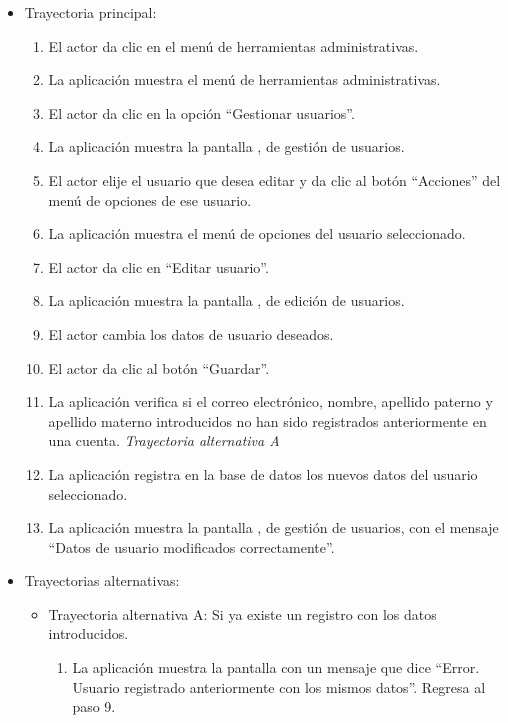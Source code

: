 			\begin{itemize}
				\item Trayectoria principal:
					\begin{enumerate}
						\item El actor da clic en el menú de herramientas administrativas.
						\item La aplicación muestra el menú de herramientas administrativas.
						\item El actor da clic en la opción ``Gestionar usuarios''.
						\item La aplicación muestra la pantalla , de gestión de usuarios.
						\item El actor elije el usuario que desea editar y da clic al botón ``Acciones'' del menú de opciones de ese usuario.
						\item La aplicación muestra el menú de opciones del usuario seleccionado.
						\item El actor da clic en ``Editar usuario''.
						\item La aplicación muestra la pantalla , de edición de usuarios.
						\item El actor cambia los datos de usuario deseados.
						\item El actor da clic al botón ``Guardar''.
						\item La aplicación verifica si el correo electrónico, nombre, apellido paterno y apellido materno introducidos no han sido registrados anteriormente en una cuenta. \textsl{Trayectoria alternativa A}
						\item La aplicación registra en la base de datos los nuevos datos del usuario seleccionado.
						\item La aplicación muestra la pantalla , de gestión de usuarios, con el mensaje ``Datos de usuario modificados correctamente''.
					\end{enumerate}
				\item Trayectorias alternativas:
					\begin{itemize}
						\item Trayectoria alternativa A: Si ya existe un registro con los datos introducidos.
							\begin{enumerate}
								\item La aplicación muestra la pantalla  con un mensaje que dice ``Error. Usuario registrado anteriormente con los mismos datos''. Regresa al paso 9.
							\end{enumerate}
					\end{itemize}
			\end{itemize}
		
